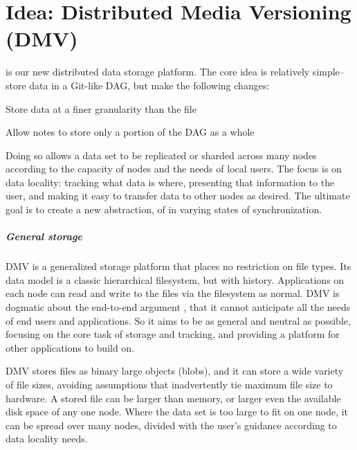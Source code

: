 \chapter{Idea: Distributed Media Versioning (DMV)}

 is our new distributed data storage
platform. The core idea is relatively simple-- store data in a Git-like DAG, but
make the following changes:

\begin{tight_enumerate}

    \item{Store data at a finer granularity than the file}

    \item{Allow notes to store only a portion of the DAG as a whole}

\end{tight_enumerate}

Doing so allows a data set to be replicated or sharded across many nodes
according to the capacity of nodes and the needs of local users. The focus is on
data locality: tracking what data is where, presenting that information to the
user, and making it easy to transfer data to other nodes as desired. The
ultimate goal is to create a new abstraction, of  in varying states of synchronization.


\paragraph{General storage}

DMV is a generalized storage platform that places no restriction on file types.
Its data model is a classic hierarchical filesystem, but with history.
Applications on each node can read and write to the files via the filesystem as
normal. DMV is dogmatic about the end-to-end argument \cite{endtoendargument},
that it cannot anticipate all the needs of end users and applications. So it
aims to be as general and neutral as possible, focusing on the core task of
storage and tracking, and providing a platform for other applications to build
on.

DMV stores files as binary large objects (blobs), and it can store a wide
variety of file sizes, avoiding assumptions that inadvertently tie maximum file
size to hardware. A stored file can be larger than memory, or larger even the
available disk space of any one node. Where the data set is too large to fit on
one node, it can be spread over many nodes, divided with the user's guidance
according to data locality needs.

